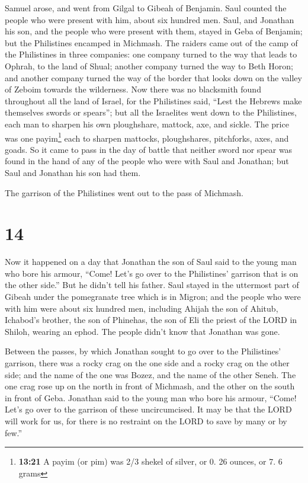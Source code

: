  Samuel arose, and went from Gilgal to Gibeah of
Benjamin. Saul counted the people who were present with him, about six
hundred men.  Saul, and Jonathan his son, and the people
who were present with them, stayed in Geba of Benjamin; but the
Philistines encamped in Michmash.  The raiders came out
of the camp of the Philistines in three companies: one company turned to
the way that leads to Ophrah, to the land of Shual; 
another company turned the way to Beth Horon; and another company turned
the way of the border that looks down on the valley of Zeboim towards
the wilderness.  Now there was no blacksmith found
throughout all the land of Israel, for the Philistines said, ``Lest the
Hebrews make themselves swords or spears'';  but all the
Israelites went down to the Philistines, each man to sharpen his own
ploughshare, mattock, axe, and sickle.  The price was one
payim\footnote{\textbf{13:21} A payim (or pim) was 2/3 shekel of silver,
  or 0. 26 ounces, or 7. 6 grams} each to sharpen mattocks,
ploughshares, pitchforks, axes, and goads.  So it came to
pass in the day of battle that neither sword nor spear was found in the
hand of any of the people who were with Saul and Jonathan; but Saul and
Jonathan his son had them.

 The garrison of the Philistines went out to the pass of
Michmash.

\hypertarget{section-13}{%
\section{14}\label{section-13}}

 Now it happened on a day that Jonathan the son of Saul
said to the young man who bore his armour, ``Come! Let's go over to the
Philistines' garrison that is on the other side.'' But he didn't tell
his father.  Saul stayed in the uttermost part of Gibeah
under the pomegranate tree which is in Migron; and the people who were
with him were about six hundred men,  including Ahijah the
son of Ahitub, Ichabod's brother, the son of Phinehas, the son of Eli
the priest of the LORD in Shiloh, wearing an ephod. The people didn't
know that Jonathan was gone.

 Between the passes, by which Jonathan sought to go over
to the Philistines' garrison, there was a rocky crag on the one side and
a rocky crag on the other side; and the name of the one was Bozez, and
the name of the other Seneh.  The one crag rose up on the
north in front of Michmash, and the other on the south in front of Geba.
 Jonathan said to the young man who bore his armour,
``Come! Let's go over to the garrison of these uncircumcised. It may be
that the LORD will work for us, for there is no restraint on the LORD to
save by many or by few.''

